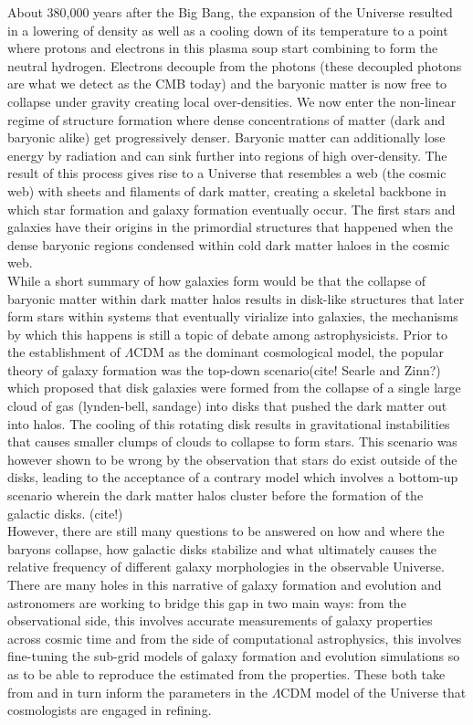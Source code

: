 About 380,000 years after the Big Bang, the expansion of the Universe resulted in a lowering of density as well as a cooling down of its temperature to a point where protons and electrons in this plasma soup start combining to form the neutral hydrogen. Electrons decouple from the photons (these decoupled photons are what we detect as the CMB today) and the baryonic matter is now free to collapse under gravity creating local over-densities. We now enter the non-linear regime of structure formation where dense concentrations of matter (dark and baryonic alike) get progressively denser. Baryonic matter can additionally lose energy by radiation and can sink further into regions of high over-density. The result of this process gives rise to a Universe that resembles a web (the cosmic web) with sheets and filaments of dark matter, creating a skeletal backbone in which star formation and galaxy formation eventually occur. The first stars and galaxies have their origins in the primordial structures that happened when the dense baryonic regions condensed within cold dark matter haloes in the cosmic web.\\

While a short summary of how galaxies form would be that the collapse of baryonic matter within dark matter halos results in disk-like structures that later form stars within systems that eventually virialize into galaxies, the mechanisms by which this happens is still a topic of debate among astrophysicists.  Prior to the establishment of $\Lambda$CDM as the dominant cosmological model, the popular theory of galaxy formation was the top-down scenario(cite! Searle and Zinn?) which proposed that disk galaxies were formed from the collapse of a single large cloud of gas (lynden-bell, sandage) into disks that pushed the dark matter out into halos. The cooling of this rotating disk results in gravitational instabilities that causes smaller clumps of clouds to collapse to form stars. This scenario was however shown to be wrong by the observation that stars do exist outside of the disks, leading to the acceptance of a contrary model which involves a bottom-up scenario wherein the dark matter halos cluster before the formation of the galactic disks. (cite!) \\

However, there are still many questions to be answered on how and where the baryons collapse, how galactic disks stabilize and what ultimately causes the relative frequency of different galaxy morphologies in the observable Universe. There are many holes in this narrative of galaxy formation and evolution and astronomers are working to bridge this gap in two main ways: from the observational side, this involves accurate measurements of galaxy properties across cosmic time and from the side of computational astrophysics, this involves fine-tuning the sub-grid models of galaxy formation and evolution simulations so as to be able to reproduce the estimated from the properties. These both take from and in turn inform the parameters in the $\Lambda$CDM model of the Universe that cosmologists are engaged in refining.\\


